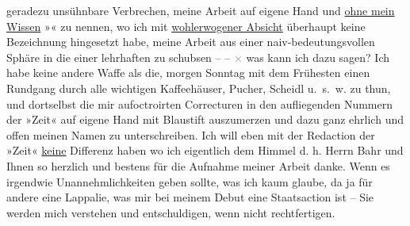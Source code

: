                geradezu unsühnbare Verbrechen, meine Arbeit auf eigene Hand und \uline{ohne mein Wissen} »\label{K_L03697-2v}\label{K_L03697-2}« zu nennen, wo ich
               mit {\pb}\uline{wohlerwogener Absicht} überhaupt keine Bezeichnung
               hingesetzt habe, meine Arbeit aus einer naiv-bedeutungsvollen Sphäre in die einer
               lehrhaften zu schubsen – – \textcolor{gray}{×} was
               kann ich dazu sagen? Ich habe keine andere Waffe als die, morgen Sonntag mit dem
               Frühesten einen Rundgang durch alle wichtigen Kaffeehäuser, Pucher, Scheidl u. s. w. zu
               thun, und dortselbst die mir aufoctroirten Correcturen in den aufliegenden Nummern
               der »Zeit« auf eigene Hand mit Blaustift
               auszumerzen und dazu {\pb}ganz ehrlich und offen meinen Namen zu
               unterschreiben. Ich will eben mit der Redaction der »Zeit« \uline{keine} Differenz haben wo ich
               eigentlich dem Himmel d. h. Herrn Bahr und
               Ihnen so herzlich und bestens für die Aufnahme meiner Arbeit danke. Wenn es irgendwie
               Unannehmlichkeiten geben sollte, was ich kaum glaube, da ja für andere eine Lappalie,
               was mir bei meinem Debut eine Staatsaction ist – Sie werden mich verstehen und
               entschuldigen, wenn nicht rechtfertigen.\pend
           
